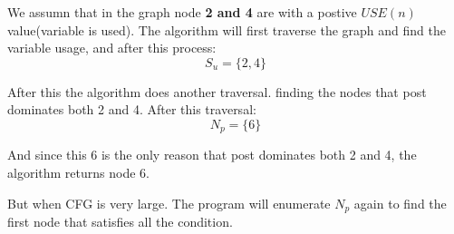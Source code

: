\documentclass[12pt]{article}
\begin{document}
We assumn that in the graph node {\bf 2 and 4} are with a postive
$USE(n)$ value(variable is used). The algorithm will first traverse
the graph and find the variable usage, and after this process:
$$S_{u} = \{2, 4\}$$

After this the algorithm does another traversal. finding the nodes
that post dominates both 2 and 4. After this traversal:
$$N_{p} = \{6\}$$

And since this 6 is the only reason that post dominates both 2 and 4,
the algorithm returns node 6.

But when CFG is very large. The program will enumerate $N_{p}$ again
to find the first node that satisfies all the condition.
\end{document}
